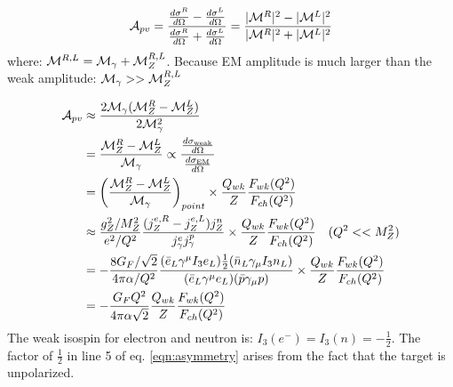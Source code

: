 \begin{equation*}
    \mathcal{A}_{pv} = \frac{\frac{d\sigma^R}{d\Omega} - \frac{d\sigma^L}{d\Omega}}{\frac{d\sigma^R}{d\Omega} + \frac{d\sigma^L}{d\Omega}} 
    = \frac{|\mathcal{M}^R|^2 - |\mathcal{M}^L|^2}{|\mathcal{M}^R|^2 + |\mathcal{M}^L|^2}
\end{equation*}
where: $\mathcal{M}^{R, L} = \mathcal{M}_{\gamma} + \mathcal{M}_Z^{R,L}$. Because EM amplitude is much 
larger than the weak amplitude: $\mathcal{M}_\gamma >> \mathcal{M}_Z^{R, L}$

\begin{equation}
    \begin{aligned}
	\mathcal{A}_{pv} &\approx \frac{2\mathcal{M}_\gamma (\mathcal{M}_Z^R - \mathcal{M}_Z^L)}{2\mathcal{M}^2_\gamma}	\\
	    &= \frac{\mathcal{M}_Z^R - \mathcal{M}_Z^L}{\mathcal{M}_\gamma} \propto \frac{\frac{d\sigma_{\text{weak}}}{d\Omega}}{\frac{d\sigma_{\text{EM}}}{d\Omega}}	\\
	    &= \left(\frac{\mathcal{M}_Z^R - \mathcal{M}_Z^L}{\mathcal{M}_\gamma}\right)_{point} \times \frac{Q_{wk}}{Z}\frac{F_{wk}(Q^2)}{F_{ch}(Q^2)}    \\
	    &\approx \frac{g^2_Z/M_Z^2}{e^2/Q^2} \frac{(j_Z^{e,R} - j_Z^{e,L}) j_Z^n}{j_\gamma^e j_\gamma^p}
		\times \frac{Q_{wk}}{Z}\frac{F_{wk}(Q^2)}{F_{ch}(Q^2)} 	\quad (Q^2 << M_Z^2) \\
	    &= -\frac{8G_F/\sqrt{2}}{4\pi\alpha/Q^2} 
		\frac{(\bar{e}_L\gamma^\mu I_3e_L) \frac{1}{2}(\bar{n}_L \gamma_\mu I_3 n_L)}{(\bar{e}_L\gamma^\mu e_L)(\bar{p}\gamma_\mu p)}
		\times \frac{Q_{wk}}{Z}\frac{F_{wk}(Q^2)}{F_{ch}(Q^2)}    \\
	    &= -\frac{G_F Q^2}{4\pi\alpha\sqrt{2}} \frac{Q_{wk}}{Z}\frac{F_{wk}(Q^2)}{F_{ch}(Q^2)}
    \end{aligned}
    \label{eqn:asymmetry}
\end{equation}
The weak isospin for electron and neutron is: $I_3(e^-) = I_3(n) = -\frac{1}{2}$.
The factor of $\frac{1}{2}$ in line 5 of eq. \ref{eqn:asymmetry} arises from
the fact that the target is unpolarized.

